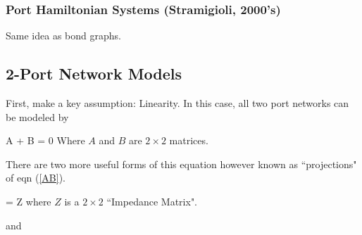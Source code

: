 \subsubsection{Port Hamiltonian Systems (Stramigioli, 2000's)}

Same idea as bond graphs.








\subsection{2-Port Network Models}

First, make a key assumption:  Linearity.   In this case, all two port networks can be modeled by	%

\bq \label{AB}
A  \left [
   \begin{array}{c} \fl_1 \\ \fl_2  \end{array}
   \right]
+
B  \left [
   \begin{array}{c} \ef_1 \\ \ef_2  \end{array}
   \right]
=
0
\eq
Where $A$ and $B$ are $2\times2$ matrices.


There are two more useful forms of this equation however known as ``projections" of eqn (\ref{AB}).	%


\bq\label{ZMatrixDef}
   \left [
   \begin{array}{c} \ef_1 \\ \ef_2  \end{array}
   \right]
=
Z  \left [
   \begin{array}{c} \fl_1 \\ \fl_2  \end{array}
   \right]
\eq
where $Z$ is a $2\times2$ ``Impedance Matrix".

and



